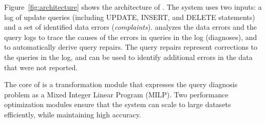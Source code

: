 Figure~\ref{fig:architecture} shows the architecture of \sys. The system uses
two inputs: a log of update queries (including UPDATE, INSERT, and DELETE
statements) and a set of identified data errors (\emph{complaints}). \sys
analyzes the data errors and the query logs to trace the causes of the errors
in queries in the log (diagnoses), and to automatically derive query repairs.
The query repairs represent corrections to the queries in the log, and can be
used to identify additional errors in the data that were not reported.

The core of \sys is a transformation module that expresses the query diagnosis
problem as a Mixed Integer Linear Program (MILP). Two performance optimization modules
ensure that the system can scale to large datasets efficiently, while
maintaining high accuracy. 



